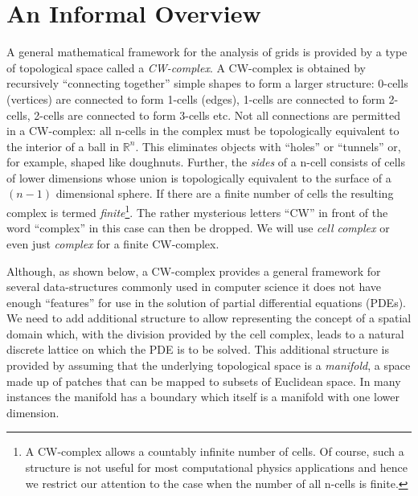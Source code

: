 \documentclass[11pt, reqno]{amsart}
\theoremstyle{definition}
\begin{document}
\section{An Informal Overview}


A general mathematical framework for the analysis of grids is provided
by a type of topological space called a \emph{CW-complex}. A
CW-complex is obtained by recursively ``connecting together'' simple
shapes to form a larger structure: 0-cells (vertices) are connected to
form 1-cells (edges), 1-cells are connected to form 2-cells, 2-cells
are connected to form 3-cells etc.  Not all connections are permitted
in a CW-complex: all n-cells in the complex must be topologically
equivalent to the interior of a ball in $\mathbb{R}^n$. This
eliminates objects with ``holes'' or ``tunnels'' or, for example,
shaped like doughnuts. Further, the \emph{sides} of a n-cell consists
of cells of lower dimensions whose union is topologically equivalent
to the surface of a $(n-1)$ dimensional sphere. If there are a finite
number of cells the resulting complex is termed
\emph{finite}\footnote{A CW-complex allows a countably infinite number
  of cells. Of course, such a structure is not useful for most
  computational physics applications and hence we restrict our
  attention to the case when the number of all n-cells is
  finite.}. The rather mysterious letters ``CW'' in front of the word
``complex'' in this case can then be dropped. We will use \emph{cell
  complex} or even just \emph{complex} for a finite CW-complex.

Although, as shown below, a CW-complex provides a general framework
for several data-structures commonly used in computer science it does
not have enough ``features'' for use in the solution of partial
differential equations (PDEs). We need to add additional structure to
allow representing the concept of a spatial domain which, with the
division provided by the cell complex, leads to a natural discrete
lattice on which the PDE is to be solved. This additional structure is
provided by assuming that the underlying topological space is a
\emph{manifold}, a space made up of patches that can be mapped to
subsets of Euclidean space. In many instances the manifold has a
boundary which itself is a manifold with one lower dimension.

\end{document}
